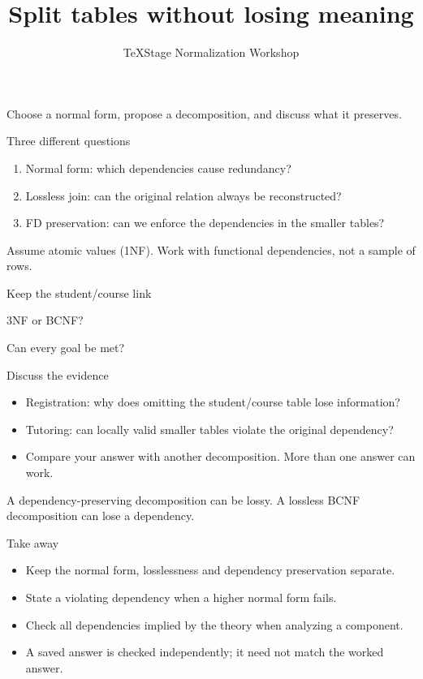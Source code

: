 \documentclass[aspectratio=169]{beamer}
\title{Split tables without losing meaning}
\author{TeXStage Normalization Workshop}
\date{}
\begin{document}
\begin{frame}\titlepage
\small Choose a normal form, propose a decomposition, and discuss what it preserves.
\end{frame}
\begin{frame}{Three different questions}
\begin{enumerate}
\item Normal form: which dependencies cause redundancy?
\item Lossless join: can the original relation always be reconstructed?
\item FD preservation: can we enforce the dependencies in the smaller tables?
\end{enumerate}
\medskip
Assume atomic values (1NF). Work with functional dependencies, not a sample of rows.
\end{frame}
\begin{frame}{Keep the student/course link}
\end{frame}
\begin{frame}{3NF or BCNF?}
\end{frame}
\begin{frame}{Can every goal be met?}
\end{frame}
\begin{frame}{Discuss the evidence}
\begin{itemize}
\item Registration: why does omitting the student/course table lose information?
\item Tutoring: can locally valid smaller tables violate the original dependency?
\item Compare your answer with another decomposition. More than one answer can work.
\end{itemize}
\medskip
A dependency-preserving decomposition can be lossy.
A lossless BCNF decomposition can lose a dependency.
\end{frame}
\begin{frame}{Take away}
\begin{itemize}
\item Keep the normal form, losslessness and dependency preservation separate.
\item State a violating dependency when a higher normal form fails.
\item Check all dependencies implied by the theory when analyzing a component.
\item A saved answer is checked independently; it need not match the worked answer.
\end{itemize}
\end{frame}
\end{document}
